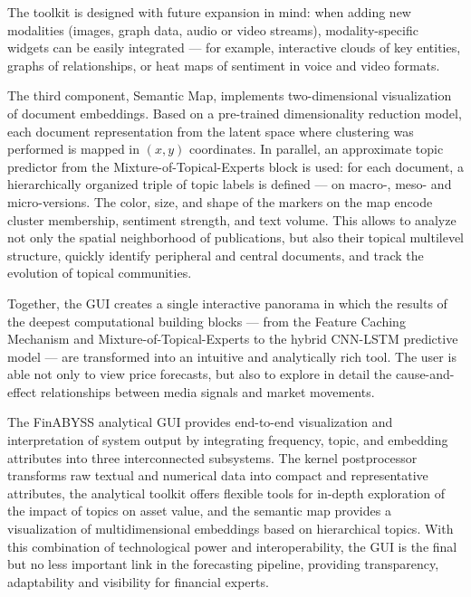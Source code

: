 The toolkit is designed with future expansion in mind: when adding new modalities (images, graph data, audio
or video streams), modality-specific widgets can be easily integrated — for example, interactive clouds of key
entities, graphs of relationships, or heat maps of sentiment in voice and video formats.

The third component, Semantic Map, implements two-dimensional visualization of document embeddings. Based
on a pre-trained dimensionality reduction model, each document representation from the latent space where
clustering was performed is mapped in $(x,y)$ coordinates. In parallel, an approximate topic predictor
from the Mixture-of-Topical-Experts block is used: for each document, a hierarchically organized triple
of topic labels is defined — on macro-, meso- and micro-versions. The color, size, and shape of the markers
on the map encode cluster membership, sentiment strength, and text volume. This allows to analyze not only
the spatial neighborhood of publications, but also their topical multilevel structure, quickly identify
peripheral and central documents, and track the evolution of topical communities.

Together, the GUI creates a single interactive panorama in which the results of the deepest computational
building blocks — from the Feature Caching Mechanism and Mixture-of-Topical-Experts to the hybrid CNN-LSTM
predictive model — are transformed into an intuitive and analytically rich tool. The user is able not only
to view price forecasts, but also to explore in detail the cause-and-effect relationships between media
signals and market movements.

The FinABYSS analytical GUI provides end-to-end visualization and interpretation of system output
by integrating frequency, topic, and embedding attributes into three interconnected subsystems. The kernel
postprocessor transforms raw textual and numerical data into compact and representative attributes,
the analytical toolkit offers flexible tools for in-depth exploration of the impact of topics on asset value,
and the semantic map provides a visualization of multidimensional embeddings based on hierarchical topics.
With this combination of technological power and interoperability, the GUI is the final but no less important
link in the forecasting pipeline, providing transparency, adaptability and visibility for financial experts.